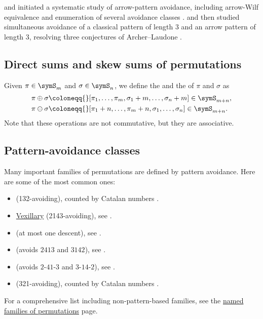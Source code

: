  and  initiated a systematic
study of arrow-pattern avoidance, including arrow-Wilf equivalence and
enumeration of several avoidance classes \cite{ArcherLaudone2026x}.
 and  then studied simultaneous
avoidance of a classical pattern of length $3$ and an arrow pattern of
length $3$, resolving three conjectures of Archer--Laudone
\cite{FuYang2026x}.


\subsection[directSumPermutations]{Direct sums and skew sums of permutations}

Given $\pi \in \symS_m$ and $\sigma \in \symS_n$, we define the 
and the  of $\pi$ and $\sigma$ as
\begin{align}
 \pi \oplus \sigma \coloneqq {}&
 [\pi_1,\dotsc,\pi_m,\sigma_1+m,\dotsc,\sigma_n+m]
 \in \symS_{m+n}, \\
 \pi \ominus \sigma \coloneqq {}&
 [\pi_1+n,\dotsc,\pi_m+n,\sigma_1,\dotsc,\sigma_n]
 \in \symS_{m+n}.
\end{align}
Note that these operations are not commutative, but they are associative.


\subsection[patternAvoidanceClasses]{Pattern-avoidance classes}

Many important families of permutations are defined by pattern avoidance.
Here are some of the most common ones:
\begin{itemize}
\item {} (132-avoiding), counted by Catalan numbers .
\item \hyperref[vexillary]{Vexillary} (2143-avoiding), see .
\item {} (at most one descent), see .
\item {} (avoids $2413$ and $3142$), see .
\item {} (avoids $2\text{-}41\text{-}3$ and
$3\text{-}14\text{-}2$), see .
\item {} (321-avoiding), counted by Catalan numbers
.
\end{itemize}
For a comprehensive list including non-pattern-based families,
see the \hyperref[namedPermutations]{named families of permutations} page.
